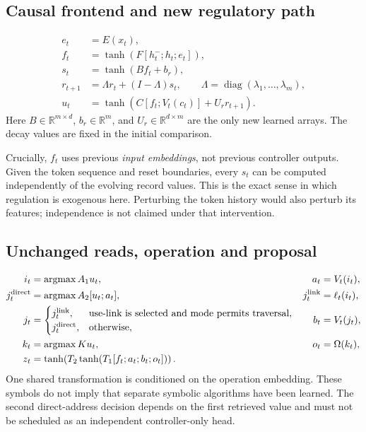 \documentclass[11pt,a4paper]{article}
\newcommand{\diag}{\operatorname{diag}}
\newcommand{\argmax}{\operatorname{argmax}}
\newcommand{\R}{\mathbb{R}}
\begin{document}
\subsection{Causal frontend and new regulatory path}
\begin{align}
e_t &= E(x_t),\\
f_t &= \tanh\!\left(F[h^-_t;h_t;e_t]\right),\\
s_t &= \tanh(Bf_t+b_r),\\
r_{t+1} &= \Lambda r_t+(I-\Lambda)s_t,\qquad
\Lambda=\diag(\lambda_1,\ldots,\lambda_m),\\
u_t &= \tanh\!\left(C[f_t;V_t(c_t)]+U_r r_{t+1}\right).
\end{align}
Here \(B\in\R^{m\times d}\), \(b_r\in\R^m\), and
\(U_r\in\R^{d\times m}\) are the only new learned arrays.
The decay values are fixed in the initial comparison.

Crucially, \(f_t\) uses previous \emph{input embeddings}, not previous controller
outputs. Given the token sequence and reset boundaries, every \(s_t\) can be
computed independently of the evolving record values. This is the exact sense
in which regulation is exogenous here. Perturbing the token history would also
perturb its features; independence is not claimed under that intervention.

\subsection{Unchanged reads, operation and proposal}
\begin{align}
i_t&=\argmax A_1u_t, & a_t&=V_t(i_t),\\
j_t^{\rm direct}&=\argmax A_2[u_t;a_t], &
j_t^{\rm link}&=\ell_t(i_t),\\
j_t&=\begin{cases}
j_t^{\rm link},&\text{use-link is selected and mode permits traversal},\\
j_t^{\rm direct},&\text{otherwise},
\end{cases}& b_t&=V_t(j_t),\\
k_t&=\argmax Ku_t,& o_t&=\Omega(k_t),\\
z_t&=\tanh\!\left(T_2\tanh\!\left(T_1[f_t;a_t;b_t;o_t]\right)\right).
\end{align}
One shared transformation is conditioned on the operation embedding. These
symbols do not imply that separate symbolic algorithms have been learned.
The second direct-address decision depends on the first retrieved value and
must not be scheduled as an independent controller-only head.
\end{document}
